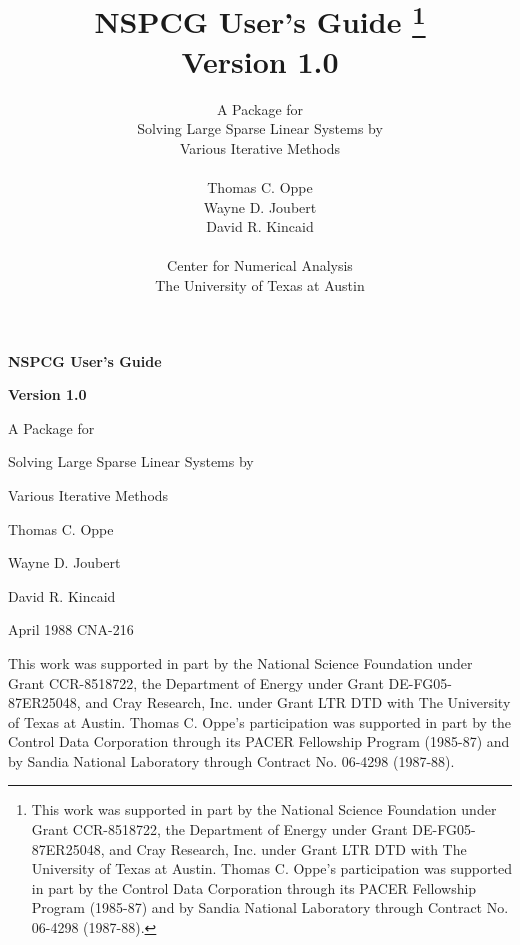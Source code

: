 \oddsidemargin 0.0in 
\evensidemargin 0.0in
\pagestyle{headings}
\topmargin -0.5in
\textheight 9.0in 
\textwidth 6.5in 
\def \la{\langle}
\def \ra{\rangle}
\def \lp{\left(}
\def \rp{\right)}
\def \lb{\left[}
\def \rb{\right]}
\def \lc{\left\{}
\def \rc{\right\}}
\def \om{\omega}
\def \oom{\frac{1}{\omega}}
\def \ha{\frac{1}{2}}
\def \sA{{\bf A}}
\def \su{{\bf u}}
\def \sb{{\bf b}}
\def \sr{{\bf r}}
\def \pD{D^{(\pi)}}
\def \pC{C^{(\pi)}}
\def \pL{C_L^{(\pi)}}
\def \pU{C_U^{(\pi)}}

\setcounter{page}{0}
\vspace*{1.0in}
\centerline{\bf NSPCG User's Guide}
\centerline{\bf Version 1.0}
\vspace*{0.24in}
\centerline{A Package for}
\centerline{Solving Large Sparse Linear Systems by}
\centerline{Various Iterative Methods}
\vspace*{0.24in}
\centerline{Thomas C. Oppe}
\centerline{Wayne D. Joubert}
\centerline{David R. Kincaid}
\vspace*{0.24in}
\centerline{April 1988 \hspace*{1.0in} CNA-216}
\vspace*{3.5in}
\noindent
This work was supported in part by the National Science Foundation under
Grant CCR-8518722, the Department of Energy under Grant DE-FG05-87ER25048,
and Cray Research, Inc. under Grant LTR DTD with The University of Texas 
at Austin.  Thomas C.  Oppe's participation was supported in part by the 
Control Data Corporation through its PACER Fellowship Program (1985-87) 
and by Sandia National Laboratory through Contract No. 06-4298 (1987-88).
\newpage
\setcounter{page}{0}
\title{NSPCG User's Guide 
         \thanks{ This work was supported in part by the National 
         Science Foundation under Grant CCR-8518722, the Department 
         of Energy under Grant DE-FG05-87ER25048, and Cray Research,
         Inc. under Grant LTR DTD with The University of Texas at 
         Austin.  Thomas C.  Oppe's participation was supported 
         in part by the Control Data Corporation through its PACER 
         Fellowship Program (1985-87) and by Sandia National Laboratory 
         through Contract No. 06-4298 (1987-88). } \\
         \large{Version 1.0}}
\author{A Package for \\
        Solving Large Sparse Linear Systems by \\
        Various Iterative Methods \\ \\ 
        Thomas C. Oppe \\ Wayne D. Joubert \\ David R. Kincaid \\ \\ 
        Center for Numerical Analysis \\
        The University of Texas at Austin}
